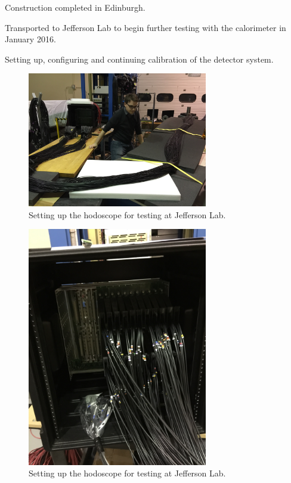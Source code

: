 Construction completed in Edinburgh.

Transported to Jefferson Lab to begin further testing with the calorimeter in January 2016.

Setting up, configuring and continuing calibration of the detector system.

\begin{figure}
	\centering
	\includegraphics[width=0.7\textwidth]{ImgChap1/JLABTestingSetup}
	\caption{Setting up the hodoscope for testing at Jefferson Lab.}		
	\label{JLABSetup}
\end{figure}

\begin{figure}
	\centering
	\includegraphics[width=0.7\textwidth]{ImgChap1/JLABTestingCrate}
	\caption{Setting up the hodoscope for testing at Jefferson Lab.}		
	\label{JLABCrate}
\end{figure}

